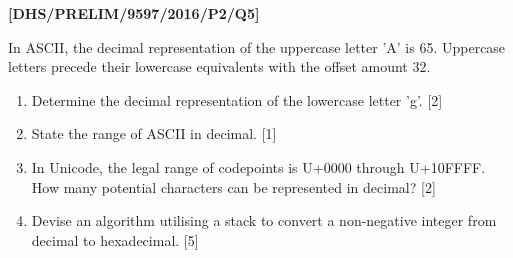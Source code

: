 \item \textbf{{[}DHS/PRELIM/9597/2016/P2/Q5{]} }

In ASCII, the decimal representation of the uppercase letter 'A' is
65. Uppercase letters precede their lowercase equivalents with the
offset amount 32.
\begin{enumerate}
\item Determine the decimal representation of the lowercase letter 'g'.\hfill{}
{[}2{]}
\item State the range of ASCII in decimal.\hfill{} {[}1{]}
\item In Unicode, the legal range of codepoints is U+0000 through U+10FFFF.
How many potential characters can be represented in decimal? \hfill{}{[}2{]}
\item Devise an algorithm utilising a stack to convert a non-negative integer
from decimal to hexadecimal.\hfill{} {[}5{]}
\end{enumerate}